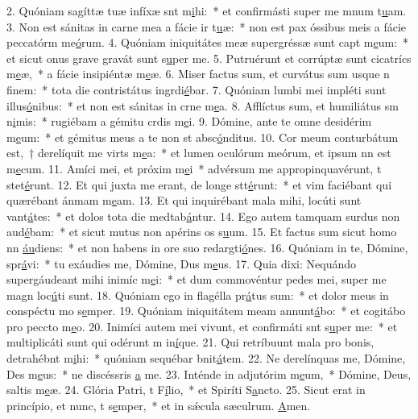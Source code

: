 2. Quóniam sagíttæ tuæ infíxæ snt m\uline{i}hi:~* et confirmásti super me mnum t\uline{u}am.
3. Non est sánitas in carne mea a fácie ir t\uline{u}æ:~* non est pax óssibus meis a fácie peccatórm me\uline{ó}rum.
4. Quóniam iniquitátes meæ supergréssæ sunt capt m\uline{e}um:~* et sicut onus grave gravát sunt s\uline{u}per me.
5. Putruérunt et corrúptæ sunt cicatrícs m\uline{e}æ,~* a fácie insipiéntæ m\uline{e}æ.
6. Miser factus sum, et curvátus sum usque n f\uline{i}nem:~* tota die contristátus ingrdi\uline{é}bar.
7. Quóniam lumbi mei impléti sunt illus\uline{ó}nibus:~* et non est sánitas in crne m\uline{e}a.
8. Afflíctus sum, et humiliátus sm n\uline{i}mis:~* rugiébam a gémitu crdis m\uline{e}i.
9. Dómine, ante te omne desidérim m\uline{e}um:~* et gémitus meus a te non st absc\uline{ó}nditus.
10. Cor meum conturbátum est,~† derelíquit me virts m\uline{e}a:~* et lumen oculórum meórum, et ipsum nn est m\uline{e}cum.
11. Amíci mei, et próxim m\uline{e}i~* advérsum me appropinquavérunt, t stet\uline{é}runt.
12. Et qui juxta me erant, de longe stt\uline{é}runt:~* et vim faciébant qui quærébant ánmam m\uline{e}am.
13. Et qui inquirébant mala mihi, locúti sunt vant\uline{á}tes:~* et dolos tota die medtab\uline{á}ntur.
14. Ego autem tamquam surdus non aud\uline{é}bam:~* et sicut mutus non apérins os s\uline{u}um.
15. Et factus sum sicut homo nn \uline{áu}diens:~* et non habens in ore suo redargti\uline{ó}nes.
16. Quóniam in te, Dómine, spr\uline{á}vi:~* tu exáudies me, Dómine, Dus m\uline{e}us.
17. Quia dixi: Nequándo supergáudeant mihi inimíc m\uline{e}i:~* et dum commovéntur pedes mei, super me magn loc\uline{ú}ti sunt.
18. Quóniam ego in flagélla pr\uline{á}tus sum:~* et dolor meus in conspéctu mo s\uline{e}mper.
19. Quóniam iniquitátem meam annunt\uline{á}bo:~* et cogitábo pro peccto m\uline{e}o.
20. Inimíci autem mei vivunt, et confirmáti snt s\uline{u}per me:~* et multiplicáti sunt qui odérunt m in\uline{í}que.
21. Qui retríbuunt mala pro bonis, detrahébnt m\uline{i}hi:~* quóniam sequébar bnit\uline{á}tem.
22. Ne derelínquas me, Dómine, Des m\uline{e}us:~* ne discéssris \uline{a} me.
23. Inténde in adjutórim m\uline{e}um,~* Dómine, Deus, saltis m\uline{e}æ.
24. Glória Patri, t F\uline{í}lio,~* et Spiríti S\uline{a}ncto.
25. Sicut erat in princípio, et nunc, t s\uline{e}mper,~* et in sǽcula sæculrum. \uline{A}men.
